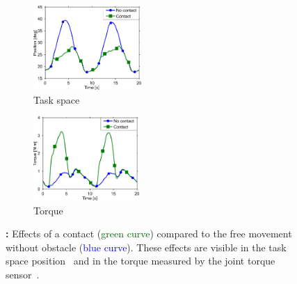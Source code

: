 
%
%

%
	\begin{figure}[t]
		\centering
		\begin{subfigure}[t]{0.48\hsize}
			\centering
			\includegraphics[height=3.2cm]{fig/exp1_effectContactQ}%
			\caption{Task space}
			\label{fig:exp1:effects_contact:a}
		\end{subfigure}
		\hfill
		\begin{subfigure}[t]{0.48\hsize}
			\centering
			\includegraphics[height=3.2cm]{fig/exp1_effectContactT}
			\caption{Torque}
			\label{fig:exp1:effects_contact:b}
		\end{subfigure}
		\caption{\textbf{:} Effects of a contact (\textcolor{darkgreen}{green curve}) compared to the free movement without obstacle (\textcolor{blue}{blue curve}). 
		These effects are visible in the task space position~ and in the torque measured by the joint torque sensor~.
		}
		\label{fig:exp1:effects_contact}
        \figspace
	\end{figure}


